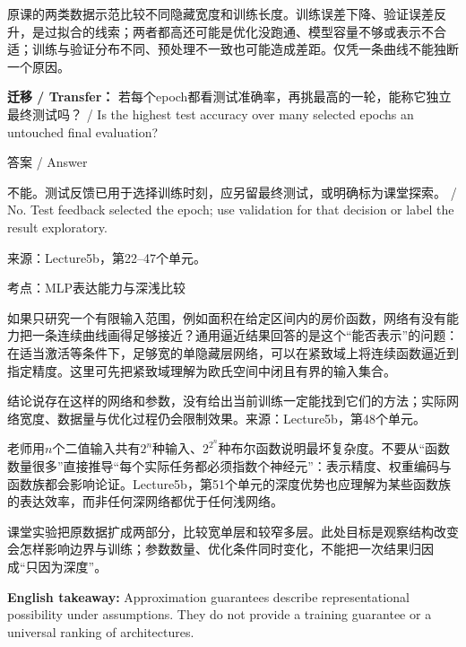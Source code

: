 原课的两类数据示范比较不同隐藏宽度和训练长度。训练误差下降、验证误差反升，是过拟合的线索；两者都高还可能是优化没跑通、模型容量不够或表示不合适；训练与验证分布不同、预处理不一致也可能造成差距。仅凭一条曲线不能独断一个原因。


\textbf{迁移 / Transfer：} 若每个epoch都看测试准确率，再挑最高的一轮，能称它独立最终测试吗？ / Is the highest test accuracy over many selected epochs an untouched final evaluation?



\begin{StudySolution}{答案 / Answer}


不能。测试反馈已用于选择训练时刻，应另留最终测试，或明确标为课堂探索。 / No. Test feedback selected the epoch; use validation for that decision or label the result exploratory.


\end{StudySolution}


来源：Lecture5b，第22–47个单元。








考点：MLP表达能力与深浅比较

如果只研究一个有限输入范围，例如面积在给定区间内的房价函数，网络有没有能力把一条连续曲线画得足够接近？通用逼近结果回答的是这个“能否表示”的问题：在适当激活等条件下，足够宽的单隐藏层网络，可以在紧致域上将连续函数逼近到指定精度。这里可先把紧致域理解为欧氏空间中闭且有界的输入集合。


结论说存在这样的网络和参数，没有给出当前训练一定能找到它们的方法；实际网络宽度、数据量与优化过程仍会限制效果。来源：Lecture5b，第48个单元。


老师用\(n\)个二值输入共有\(2^n\)种输入、\(2^{2^n}\)种布尔函数说明最坏复杂度。不要从“函数数量很多”直接推导“每个实际任务都必须指数个神经元”：表示精度、权重编码与函数族都会影响论证。Lecture5b，第51个单元的深度优势也应理解为某些函数族的表达效率，而非任何深网络都优于任何浅网络。


课堂实验把原数据扩成两部分，比较宽单层和较窄多层。此处目标是观察结构改变会怎样影响边界与训练；参数数量、优化条件同时变化，不能把一次结果归因成“只因为深度”。


\textbf{English takeaway:} Approximation guarantees describe representational possibility under assumptions. They do not provide a training guarantee or a universal ranking of architectures.


